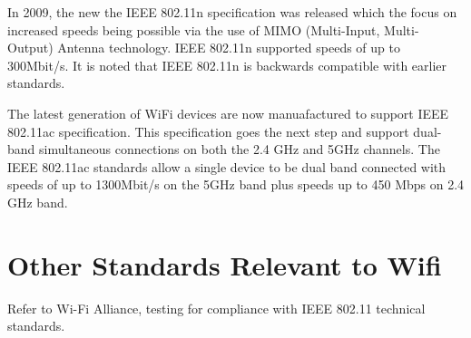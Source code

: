 In 2009, the new the IEEE 802.11n specification was released which the focus on increased speeds being possible via the use of MIMO (Multi-Input, Multi-Output) Antenna technology. IEEE 802.11n supported speeds of up to 300Mbit/s. It is noted that IEEE 802.11n is backwards compatible with earlier standards.

The latest generation of WiFi devices are now manuafactured to support IEEE 802.11ac specification.  This specification goes the next step and support dual-band simultaneous connections on both the 2.4 GHz and 5GHz channels. The IEEE 802.11ac standards allow a single device to be dual band connected with speeds of up to 1300Mbit/s on the 5GHz band plus speeds up to 450 Mbps on 2.4 GHz band.



\section{Other Standards Relevant to Wifi}

Refer to Wi-Fi Alliance, testing for compliance with IEEE 802.11 technical standards.
